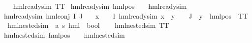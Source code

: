 \begin{isabellebody}
\ \ \isanewline
{\isachardoublequoteopen}hml{\isacharunderscore}{\kern0pt}ready{\isacharunderscore}{\kern0pt}sim\ TT{\isachardoublequoteclose}\ {\isacharbar}{\kern0pt}\isanewline
{\isachardoublequoteopen}hml{\isacharunderscore}{\kern0pt}ready{\isacharunderscore}{\kern0pt}sim\ {\isacharparenleft}{\kern0pt}hml{\isacharunderscore}{\kern0pt}pos\ {\isasymalpha}\ {\isasymphi}{\isacharparenright}{\kern0pt}{\isachardoublequoteclose}\ \ {\isachardoublequoteopen}hml{\isacharunderscore}{\kern0pt}ready{\isacharunderscore}{\kern0pt}sim\ {\isasymphi}{\isachardoublequoteclose}\ {\isacharbar}{\kern0pt}\isanewline
{\isachardoublequoteopen}hml{\isacharunderscore}{\kern0pt}ready{\isacharunderscore}{\kern0pt}sim\ {\isacharparenleft}{\kern0pt}hml{\isacharunderscore}{\kern0pt}conj\ I\ J\ {\isasymPhi}{\isacharparenright}{\kern0pt}{\isachardoublequoteclose}\ \ \isanewline
{\isachardoublequoteopen}{\isacharparenleft}{\kern0pt}{\isasymforall}x\ {\isasymin}\ {\isacharparenleft}{\kern0pt}{\isasymPhi}\ {\isacharbackquote}{\kern0pt}\ I{\isacharparenright}{\kern0pt}{\isachardot}{\kern0pt}\ hml{\isacharunderscore}{\kern0pt}ready{\isacharunderscore}{\kern0pt}sim\ x{\isacharparenright}{\kern0pt}\ {\isasymand}\ {\isacharparenleft}{\kern0pt}{\isasymforall}y\ {\isasymin}\ {\isacharparenleft}{\kern0pt}{\isasymPhi}\ {\isacharbackquote}{\kern0pt}\ J{\isacharparenright}{\kern0pt}{\isachardot}{\kern0pt}\ {\isacharparenleft}{\kern0pt}{\isasymexists}{\isasymalpha}{\isachardot}{\kern0pt}\ y\ {\isacharequal}{\kern0pt}\ {\isacharparenleft}{\kern0pt}hml{\isacharunderscore}{\kern0pt}pos\ {\isasymalpha}\ TT{\isacharparenright}{\kern0pt}{\isacharparenright}{\kern0pt}{\isacharparenright}{\kern0pt}{\isachardoublequoteclose}\isanewline
\isanewline
{}\isamarkupfalse%
\ hml{\isacharunderscore}{\kern0pt}{}{\isacharunderscore}{\kern0pt}nested{\isacharunderscore}{\kern0pt}sim\ {\isacharcolon}{\kern0pt}{\isacharcolon}{\kern0pt}\ {\isachardoublequoteopen}{\isacharparenleft}{\kern0pt}{\isacharprime}{\kern0pt}a{\isacharcomma}{\kern0pt}\ {\isacharprime}{\kern0pt}s{\isacharparenright}{\kern0pt}\ hml\ {\isasymRightarrow}\ bool{\isachardoublequoteclose}\ \isanewline
\ \ \isanewline
{\isachardoublequoteopen}hml{\isacharunderscore}{\kern0pt}{}{\isacharunderscore}{\kern0pt}nested{\isacharunderscore}{\kern0pt}sim\ TT{\isachardoublequoteclose}\ {\isacharbar}{\kern0pt}\isanewline
{\isachardoublequoteopen}hml{\isacharunderscore}{\kern0pt}{}{\isacharunderscore}{\kern0pt}nested{\isacharunderscore}{\kern0pt}sim\ {\isacharparenleft}{\kern0pt}hml{\isacharunderscore}{\kern0pt}pos\ {\isasymalpha}\ {\isasymphi}{\isacharparenright}{\kern0pt}{\isachardoublequoteclose}\ \ {\isachardoublequoteopen}hml{\isacharunderscore}{\kern0pt}{}{\isacharunderscore}{\kern0pt}nested{\isacharunderscore}{\kern0pt}sim\ {\isasymphi}{\isachardoublequoteclose}\ {\isacharbar}{\kern0pt}\isanewline

\end{isabellebody}
